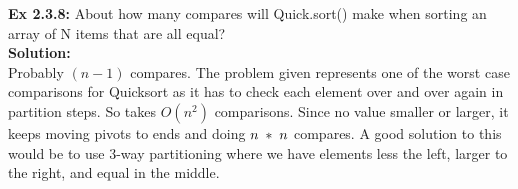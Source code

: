 \documentclass[11pt,fleqn]{article}
\begin{document}
\textbf{Ex 2.3.8:} About how many compares will Quick.sort() make when sorting an array of
N items that are all equal?\\

\textbf{Solution:}\\
Probably $(n-1)$ compares. The problem given represents one of the worst case comparisons for Quicksort as it has to check each element over and over again in partition steps. So takes $O(n^2)$ comparisons. Since no value smaller or larger, it keeps moving pivots to ends and doing $n \thickspace *\thickspace n$ compares.
A good solution to this would be to use 3-way partitioning where we have elements less the left, larger to the right, and equal in the middle.
\end{document}
